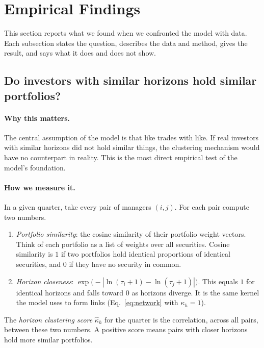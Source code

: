 \section{Empirical Findings}
\label{sec:findings}

This section reports what we found when we confronted the model with data. Each subsection states the question, describes the data and method, gives the result, and says what it does and does not show.

\subsection{Do investors with similar horizons hold similar portfolios?}
\label{sec:kappa}

\paragraph{Why this matters.} The central assumption of the model is that like trades with like. If real investors with similar horizons did not hold similar things, the clustering mechanism would have no counterpart in reality. This is the most direct empirical test of the model's foundation.

\paragraph{How we measure it.} In a given quarter, take every pair of managers $(i,j)$. For each pair compute two numbers.
\begin{enumerate}[leftmargin=*]
\item \emph{Portfolio similarity}: the cosine similarity of their portfolio weight vectors. Think of each portfolio as a list of weights over all securities. Cosine similarity is $1$ if two portfolios hold identical proportions of identical securities, and $0$ if they have no security in common.
\item \emph{Horizon closeness}: $\exp\!\big(-|\ln(\tau_i+1)-\ln(\tau_j+1)|\big)$. This equals $1$ for identical horizons and falls toward $0$ as horizons diverge. It is the same kernel the model uses to form links (Eq.~\eqref{eq:network} with $\kappa_h=1$).
\end{enumerate}
The \emph{horizon clustering score} $\hat\kappa_h$ for the quarter is the correlation, across all pairs, between these two numbers. A positive score means pairs with closer horizons hold more similar portfolios.


